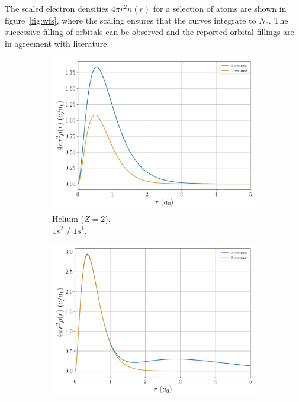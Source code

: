 \documentclass[a4paper,DIV=12,english]{scrartcl}
\begin{document}
The scaled electron densities $4\pi r^2 n(r)$ for a selection of atoms are shown in figure~\ref{fig:wfs}, where the scaling ensures that the curves integrate to $N_e$. The successive filling of orbitals can be observed and the reported orbital fillings are in agreement with literature.

\begin{figure}
    \centering
    \begin{subfigure}{0.49\textwidth}
        \centering
        \includegraphics[width=\textwidth]{../plots/density/density_2.pdf}
        \caption{Helium ($Z=2$). \\$1s^2$ / $1s^1$.}
        \label{subfig:wf2}
    \end{subfigure}
    \begin{subfigure}{0.49\textwidth}
        \centering
        \includegraphics[width=\textwidth]{../plots/density/density_3.pdf}

\end{subfigure}
\end{figure}
\end{document}
